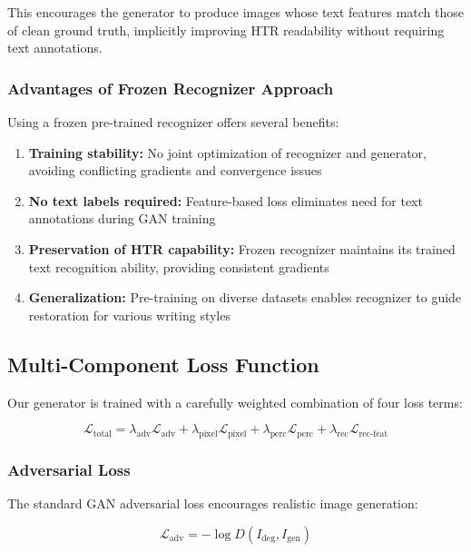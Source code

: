 \documentclass[journal]{IEEEtran}
\begin{document}
This encourages the generator to produce images whose text features match those of clean ground truth, implicitly improving HTR readability without requiring text annotations.

\subsubsection{Advantages of Frozen Recognizer Approach}

Using a frozen pre-trained recognizer offers several benefits:

\begin{enumerate}
    \item \textbf{Training stability:} No joint optimization of recognizer and generator, avoiding conflicting gradients and convergence issues
    \item \textbf{No text labels required:} Feature-based loss eliminates need for text annotations during GAN training
    \item \textbf{Preservation of HTR capability:} Frozen recognizer maintains its trained text recognition ability, providing consistent gradients
    \item \textbf{Generalization:} Pre-training on diverse datasets enables recognizer to guide restoration for various writing styles
\end{enumerate}

\subsection{Multi-Component Loss Function}

Our generator is trained with a carefully weighted combination of four loss terms:

\begin{equation}
\mathcal{L}_{\text{total}} = \lambda_{\text{adv}}\mathcal{L}_{\text{adv}} + \lambda_{\text{pixel}}\mathcal{L}_{\text{pixel}} + \lambda_{\text{perc}}\mathcal{L}_{\text{perc}} + \lambda_{\text{rec}}\mathcal{L}_{\text{rec-feat}}
\end{equation}

\subsubsection{Adversarial Loss}

The standard GAN adversarial loss encourages realistic image generation:

\begin{equation}
\mathcal{L}_{\text{adv}} = -\log D(I_{\text{deg}}, I_{\text{gen}})
\end{equation}
\end{document}
